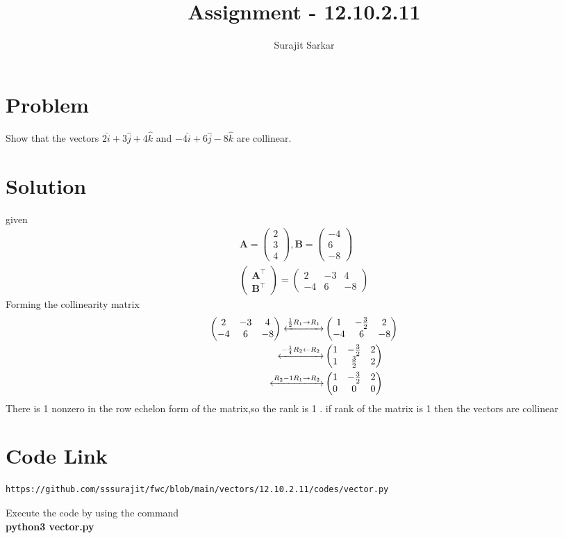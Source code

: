 \documentclass[12pt]{article}
\title{\mytitle}
\title{
Assignment - 12.10.2.11
}
\author{Surajit Sarkar}
\newcommand{\myvec}[1]{\ensuremath{\begin{pmatrix}#1\end{pmatrix}}}
\let\vec\mathbf
\begin{document}
\maketitle
\tableofcontents
\bigskip
\section{\textbf{Problem}}
Show that the vectors $2\hat{i}+3\hat{j}+4\hat{k}$ and $-4\hat{i}+6\hat{j}-8\hat{k}$ are collinear.
\section{\textbf{Solution}}
given
\begin{align}
\vec{A}=\myvec{2\\3\\4},\vec{B}=\myvec{-4\\6\\-8}\\
\myvec{\vec{A}^{\top}\\ \vec{B}^{\top}}=\myvec{2&-3&4\\-4&6&-8}
 \end{align}
 Forming the collinearity matrix
 \begin{align}        
\myvec{2&-3&4\\-4&6&-8} \xleftrightarrow{\frac{1}{2}R_1\to R_1}&\myvec{1&-\frac{3}{2}&2\\-4&6&-8}\\
\xleftrightarrow{-\frac{1}{4}R_2\leftarrow R_2}&\myvec{1&-\frac{3}{2}&2\\1&\frac{3}{2}&2}\\
\xleftrightarrow{R_2-1R_1\to R_2}&\myvec{1&-\frac{3}{2}&2\\0&0&0}
\end{align}
There is 1 nonzero in the row echelon form of the matrix,so the rank is 1 .
if rank of the matrix is 1 then the vectors are collinear
\section{\textbf{Code Link}}
\begin{lstlisting}
https://github.com/sssurajit/fwc/blob/main/vectors/12.10.2.11/codes/vector.py
\end{lstlisting}
Execute the code by using the command\\
\textbf{python3 vector.py}
\end{document}
